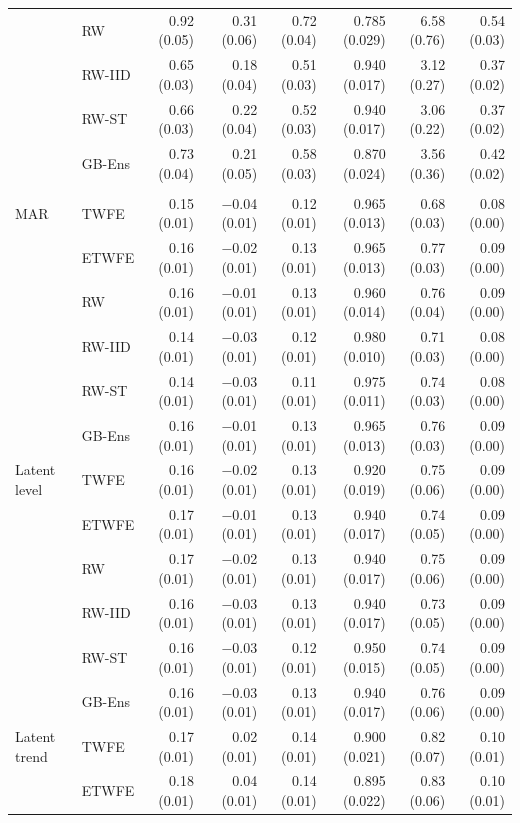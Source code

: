 \begin{table}
\begin{tabular*}{1\linewidth}{@{\extracolsep{\fill}}llrrrrrr}
 & RW & 0.92 (0.05) & 0.31 (0.06) & 0.72 (0.04) & 0.785 (0.029) & 6.58 (0.76) & 0.54 (0.03) \\ 
 & RW-IID & 0.65 (0.03) & 0.18 (0.04) & 0.51 (0.03) & 0.940 (0.017) & 3.12 (0.27) & 0.37 (0.02) \\ 
 & RW-ST & 0.66 (0.03) & 0.22 (0.04) & 0.52 (0.03) & 0.940 (0.017) & 3.06 (0.22) & 0.37 (0.02) \\ 
 & GB-Ens & 0.73 (0.04) & 0.21 (0.05) & 0.58 (0.03) & 0.870 (0.024) & 3.56 (0.36) & 0.42 (0.02) \\ 
\midrule\addlinespace[2.5pt]
\multicolumn{8}{l}{With covariates, event year 0} \\[2.5pt] 
\midrule\addlinespace[2.5pt]
MAR & TWFE & 0.15 (0.01) & −0.04 (0.01) & 0.12 (0.01) & 0.965 (0.013) & 0.68 (0.03) & 0.08 (0.00) \\ 
 & ETWFE & 0.16 (0.01) & −0.02 (0.01) & 0.13 (0.01) & 0.965 (0.013) & 0.77 (0.03) & 0.09 (0.00) \\ 
 & RW & 0.16 (0.01) & −0.01 (0.01) & 0.13 (0.01) & 0.960 (0.014) & 0.76 (0.04) & 0.09 (0.00) \\ 
 & RW-IID & 0.14 (0.01) & −0.03 (0.01) & 0.12 (0.01) & 0.980 (0.010) & 0.71 (0.03) & 0.08 (0.00) \\ 
 & RW-ST & 0.14 (0.01) & −0.03 (0.01) & 0.11 (0.01) & 0.975 (0.011) & 0.74 (0.03) & 0.08 (0.00) \\ 
 & GB-Ens & 0.16 (0.01) & −0.01 (0.01) & 0.13 (0.01) & 0.965 (0.013) & 0.76 (0.03) & 0.09 (0.00) \\ 
Latent level & TWFE & 0.16 (0.01) & −0.02 (0.01) & 0.13 (0.01) & 0.920 (0.019) & 0.75 (0.06) & 0.09 (0.00) \\ 
 & ETWFE & 0.17 (0.01) & −0.01 (0.01) & 0.13 (0.01) & 0.940 (0.017) & 0.74 (0.05) & 0.09 (0.00) \\ 
 & RW & 0.17 (0.01) & −0.02 (0.01) & 0.13 (0.01) & 0.940 (0.017) & 0.75 (0.06) & 0.09 (0.00) \\ 
 & RW-IID & 0.16 (0.01) & −0.03 (0.01) & 0.13 (0.01) & 0.940 (0.017) & 0.73 (0.05) & 0.09 (0.00) \\ 
 & RW-ST & 0.16 (0.01) & −0.03 (0.01) & 0.12 (0.01) & 0.950 (0.015) & 0.74 (0.05) & 0.09 (0.00) \\ 
 & GB-Ens & 0.16 (0.01) & −0.03 (0.01) & 0.13 (0.01) & 0.940 (0.017) & 0.76 (0.06) & 0.09 (0.00) \\ 
Latent trend & TWFE & 0.17 (0.01) & 0.02 (0.01) & 0.14 (0.01) & 0.900 (0.021) & 0.82 (0.07) & 0.10 (0.01) \\ 
 & ETWFE & 0.18 (0.01) & 0.04 (0.01) & 0.14 (0.01) & 0.895 (0.022) & 0.83 (0.06) & 0.10 (0.01) \\ 

\end{tabular*}
\end{table}
